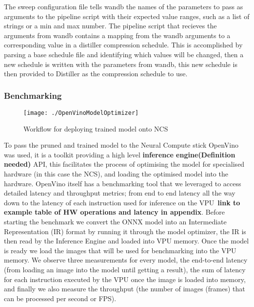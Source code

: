 \documentclass[../Dissertation.tex]{subfiles}
\begin{document}
The sweep configuration file tells wandb the names of the parameters to pass as arguments to the pipeline script with their expected value ranges, such as a list of strings or a min and max number. 
The pipeline script that recieves the arguments from wandb contains a mapping from the wandb arguments to a corresponding value in a distiller compression schedule.
This is accomplished by parsing a base schedule file and identifying which values will be changed, then a new schedule is written with the parameters from wandb, this new schedule is then provided to Distiller as the compression schedule to use.



\subsubsection{Benchmarking}

\begin{figure}[H]
	\centering
	\texttt{[image: ./OpenVinoModelOptimizer]}
	\caption{Workflow for deploying trained model onto NCS~\autocite{ModelOptimizerDeveloper}}
	\label{fig:OpenVinoWorkflow}
\end{figure}


To pass the pruned and trained model to the Neural Compute stick OpenVino was used, it is a toolkit providing a high level \textbf{inference engine(\color{red}Definition needed)} API, this facilitates the process of optimising the model for specialised hardware (in this case the NCS), and loading the optimised model into the hardware. 
OpenVino itself has a benchmarking tool that we leveraged to access detailed latency and throughput metrics; from end to end latency all the way down to the latency of each instruction used for inference on the VPU~\textbf{\color{red}link to example table of HW operations and latency in appendix}. 
Before starting the benchmark we convert the ONNX model into an Intermediate Representation (IR) format by running it through the model optimizer, the IR is then read by the Inference Engine and loaded into VPU memory.
Once the model is ready we load the images that will be used for benchmarking into the VPU memory.
We observe three measurements for every model, the end-to-end latency (from loading an image into the model until getting a result), the sum of latency for each instruction executed by the VPU once the image is loaded into memory, and finally we also measure the throughput (the number of images (frames) that can be processed per second or FPS).
\end{document}

